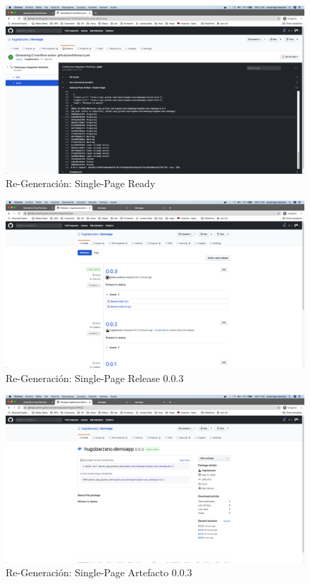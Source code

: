 \documentclass[a4paper,11pt]{book}
\begin{document}
   \begin{figure}[H]
\centering
\includegraphics[scale=0.2]{imagenes/casouso/4_5.png}
\caption{  Re-Generación: Single-Page Ready }
\end{figure}


   \begin{figure}[H]
\centering
\includegraphics[scale=0.2]{imagenes/casouso/4_6.png}
\caption{  Re-Generación: Single-Page Release 0.0.3 }
\end{figure}


   \begin{figure}[H]
\centering
\includegraphics[scale=0.2]{imagenes/casouso/4_7.png}
\caption{  Re-Generación: Single-Page Artefacto 0.0.3 }
\end{figure}
\end{document}

